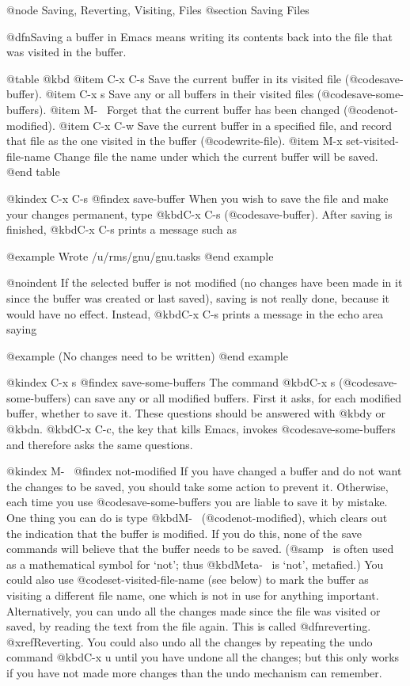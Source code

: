 {{{{{{{{{{{{{{{{{{{{@node Saving, Reverting, Visiting, Files
@section Saving Files

  @dfn{Saving} a buffer in Emacs means writing its contents back into the file
that was visited in the buffer.

@table @kbd
@item C-x C-s
Save the current buffer in its visited file (@code{save-buffer}).
@item C-x s
Save any or all buffers in their visited files (@code{save-some-buffers}).
@item M-~
Forget that the current buffer has been changed (@code{not-modified}).
@item C-x C-w
Save the current buffer in a specified file, and record that file as
the one visited in the buffer (@code{write-file}).
@item M-x set-visited-file-name
Change file the name under which the current buffer will be saved.
@end table

@kindex C-x C-s
@findex save-buffer
  When you wish to save the file and make your changes permanent, type
@kbd{C-x C-s} (@code{save-buffer}).  After saving is finished, @kbd{C-x C-s}
prints a message such as

@example
Wrote /u/rms/gnu/gnu.tasks
@end example

@noindent
If the selected buffer is not modified (no changes have been made in it
since the buffer was created or last saved), saving is not really done,
because it would have no effect.  Instead, @kbd{C-x C-s} prints a message
in the echo area saying

@example
(No changes need to be written)
@end example

@kindex C-x s
@findex save-some-buffers
  The command @kbd{C-x s} (@code{save-some-buffers}) can save any or all modified
buffers.  First it asks, for each modified buffer, whether to save it.
These questions should be answered with @kbd{y} or @kbd{n}.  @kbd{C-x C-c},
the key that kills Emacs, invokes @code{save-some-buffers} and therefore
asks the same questions.

@kindex M-~
@findex not-modified
  If you have changed a buffer and do not want the changes to be saved, you
should take some action to prevent it.  Otherwise, each time you use
@code{save-some-buffers} you are liable to save it by mistake.  One thing
you can do is type @kbd{M-~} (@code{not-modified}), which clears out the
indication that the buffer is modified.  If you do this, none of the save
commands will believe that the buffer needs to be saved.  (@samp{~} is often
used as a mathematical symbol for `not'; thus @kbd{Meta-~} is `not', metafied.)
You could also use @code{set-visited-file-name} (see below) to mark the
buffer as visiting a different file name, one which is not in use for
anything important.  Alternatively, you can undo all the changes made since
the file was visited or saved, by reading the text from the file again.
This is called @dfn{reverting}.  @xref{Reverting}.  You could also undo all
the changes by repeating the undo command @kbd{C-x u} until you have undone
all the changes; but this only works if you have not made more changes than
the undo mechanism can remember.

}}}}}}}}}}}}}}}}}}}}
